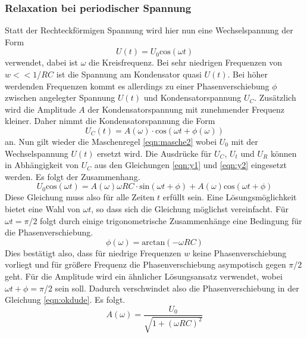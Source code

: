 \subsubsection{Relaxation bei periodischer Spannung}
Statt der Rechteckförmigen Spannung wird hier nun eine Wechselspannung der Form
\begin{equation}
    \label{eqn:y2}
U(t) = U_{0}\text{cos}(\omega t)
\end{equation}
verwendet,
dabei ist $\omega$ die Kreisfrequenz. Bei sehr niedrigen Frequenzen von $w << 1$/$RC$ ist die Spannung am Kondensator quasi $U(t)$. Bei höher werdenden Frequenzen
kommt es allerdings zu einer Phasenverschiebung $\phi$ zwischen angelegter Spannung $U(t)$ und Kondensatorspannung $U_{C}$. Zusätzlich wird die Amplitude $A$ der Kondensatorspannung 
mit zunehmender Frequenz kleiner.
Daher nimmt die Kondensatorspannung die Form
\begin{equation}
    \label{eqn:y1}
U_{C}(t) = A(\omega) \cdot \text{cos}(\omega t + \phi(\omega))
\end{equation}
an. Nun gilt wieder die Maschenregel \eqref{eqn:masche2} wobei $U_{0}$ mit der Wechselspannung $U(t)$ ersetzt wird. Die Ausdrücke für $U_{C}$, $U_{t}$ und $U_{R}$ können in Abhängigkeit von $U_{C}$ aus den Gleichungen \eqref{eqn:y1} und \eqref{eqn:y2}
eingesetzt werden.
Es folgt der Zusammenhang.
\begin{equation}
    \label{eqn:okdude}
    U_{0}\text{cos}(\omega t) = A(\omega)\omega R C \cdot \text{sin}(\omega t + \phi) + A(\omega) \text{cos}(\omega t + \phi)
\end{equation}
Diese Gleichung muss also für alle Zeiten $t$ erfüllt sein. Eine Lösungsmöglichkeit bietet eine Wahl von $\omega t$, so dass sich die Gleichung möglichst vereinfacht.
Für $\omega t = \pi$/$2$ folgt durch einige trigonometrische Zusammenhänge eine Bedingung für die Phasenverschiebung.
\begin{equation}
\label{eqn:sadge}
\phi(\omega) = \text{arctan}(-\omega RC)
\end{equation}
Dies bestätigt also, dass für niedrige Frequenzen $w$ keine Phasenverschiebung vorliegt und für größere Frequenz die Phasenverschiebung asympotisch gegen $\pi$/$2$ geht.
Für die Amplitude wird ein ähnlicher Lösungsansatz verwendet, wobei $\omega t + \phi= \pi$/$2$ sein soll. Dadurch verschwindet also die Phasenverschiebung in der Gleichung \eqref{eqn:okdude}.
Es folgt.
\begin{equation}
    \label{eqn:yeahyeah}
A(\omega) = \frac{U_{0}}{\sqrt{1+(\omega RC)^{2}}}
\end{equation}
